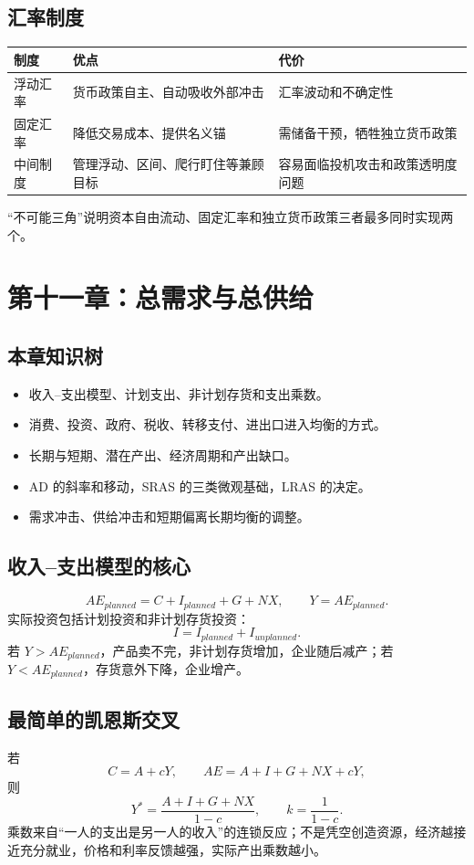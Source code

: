 \documentclass[UTF8,11pt,a4paper]{ctexart}
\begin{document}
\subsection{汇率制度}
\begin{longtable}{p{}p{}p{}}
\toprule
制度 & 优点 & 代价\\
\midrule
浮动汇率 & 货币政策自主、自动吸收外部冲击 & 汇率波动和不确定性\\
固定汇率 & 降低交易成本、提供名义锚 & 需储备干预，牺牲独立货币政策\\
中间制度 & 管理浮动、区间、爬行盯住等兼顾目标 & 容易面临投机攻击和政策透明度问题\\
\bottomrule
\end{longtable}
“不可能三角”说明资本自由流动、固定汇率和独立货币政策三者最多同时实现两个。

\newpage
\section{第十一章：总需求与总供给}

\subsection{本章知识树}
\begin{itemize}
  \item 收入--支出模型、计划支出、非计划存货和支出乘数。
  \item 消费、投资、政府、税收、转移支付、进出口进入均衡的方式。
  \item 长期与短期、潜在产出、经济周期和产出缺口。
  \item AD 的斜率和移动，SRAS 的三类微观基础，LRAS 的决定。
  \item 需求冲击、供给冲击和短期偏离长期均衡的调整。
\end{itemize}

\subsection{收入--支出模型的核心}
\[
AE_{planned}=C+I_{planned}+G+NX,
\qquad Y=AE_{planned}.
\]
实际投资包括计划投资和非计划存货投资：
\[
I=I_{planned}+I_{unplanned}.
\]
若 $Y>AE_{planned}$，产品卖不完，非计划存货增加，企业随后减产；若 $Y<AE_{planned}$，存货意外下降，企业增产。

\subsection{最简单的凯恩斯交叉}
若
\[
C=A+cY,
\qquad AE=A+I+G+NX+cY,
\]
则
\[
Y^*=\frac{A+I+G+NX}{1-c},
\qquad k=\frac1{1-c}.
\]
乘数来自“一人的支出是另一人的收入”的连锁反应；不是凭空创造资源，经济越接近充分就业，价格和利率反馈越强，实际产出乘数越小。
\end{document}
